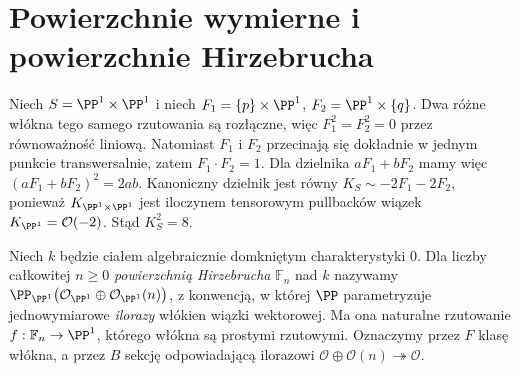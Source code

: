 \section{Powierzchnie wymierne i powierzchnie Hirzebrucha}
\label{sec:ga6-rational}

\begin{przyklad}
Niech $S=\PP^1\times\PP^1$ i niech
$F_1=\{p\}\times\PP^1$, $F_2=\PP^1\times\{q\}$.
Dwa różne włókna tego samego rzutowania są rozłączne,
więc $F_1^2=F_2^2=0$ przez równoważność liniową.
Natomiast $F_1$ i $F_2$ przecinają się dokładnie
w jednym punkcie transwersalnie, zatem
$F_1\cdot F_2=1$. Dla dzielnika $aF_1+bF_2$
mamy więc $(aF_1+bF_2)^2=2ab$.
Kanoniczny dzielnik jest równy
$K_S\sim-2F_1-2F_2$, ponieważ
$K_{\PP^1\times\PP^1}$ jest iloczynem tensorowym
pullbacków wiązek $K_{\PP^1}=\mathcal O(-2)$.
Stąd $K_S^2=8$.
\end{przyklad}

\begin{definicja}
Niech $k$ będzie ciałem algebraicznie domkniętym
charakterystyki $0$. Dla liczby całkowitej $n\ge0$
\emph{powierzchnią Hirzebrucha} $\mathbb F_n$ nad $k$
nazywamy
$\PP_{\PP^1}\bigl(\mathcal O_{\PP^1}\oplus
\mathcal O_{\PP^1}(n)\bigr)$, z konwencją, w której
$\PP$ parametryzuje jednowymiarowe \emph{ilorazy}
włókien wiązki wektorowej. Ma ona naturalne rzutowanie
$f:\mathbb F_n\to\PP^1$, którego włókna są prostymi
rzutowymi. Oznaczymy przez $F$ klasę włókna,
a przez $B$ sekcję odpowiadającą ilorazowi
$\mathcal O\oplus\mathcal O(n)\twoheadrightarrow\mathcal O$.
\end{definicja}

